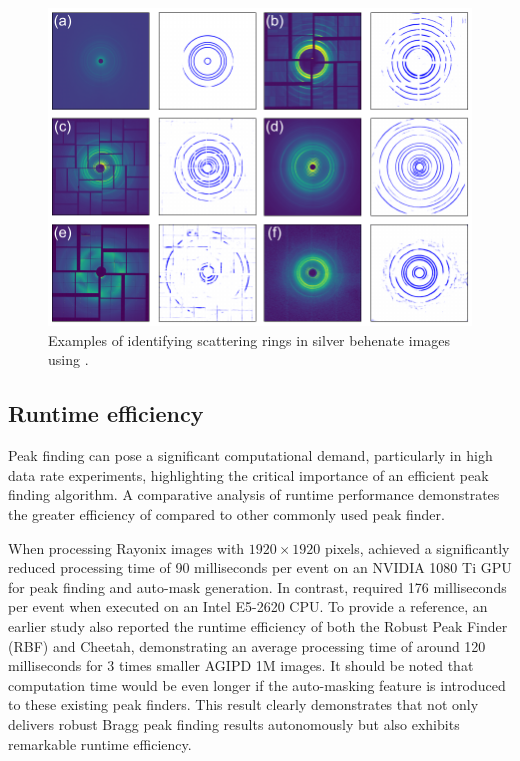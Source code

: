 \documentclass[a4paper]{article}
\begin{document}
\begin{figure}[!ht]
\centering
\includegraphics[width=\textwidth,keepaspectratio]
{./figures/automask.agbehnate.pdf}
\caption{Examples of identifying scattering rings in silver behenate images using
\peaknet{}.}
\label{fig : automask 2}
\end{figure}


\subsection{Runtime efficiency}

Peak finding can pose a significant computational demand, particularly in high data rate experiments, highlighting the critical importance of an efficient peak finding algorithm.  A comparative analysis of runtime performance demonstrates the greater efficiency of \peaknet{} compared to other commonly used \psocake{} peak finder.

When processing Rayonix images with $1920 \times 1920$ pixels, \peaknet{} achieved a significantly reduced processing time of 90 milliseconds per event on an NVIDIA 1080 Ti GPU for peak finding and auto-mask generation.  In contrast, \psocake{} required 176 milliseconds per event when executed on an Intel E5-2620 CPU.  To provide a reference, an earlier study \citep{hadian-jaziDataReductionSerial2021} also reported the runtime efficiency of both the Robust Peak Finder (RBF) and Cheetah, demonstrating an average processing time of around 120 milliseconds for 3 times smaller AGIPD 1M \citep{allahgholiAdaptiveGainIntegrating2019} images.  It should be noted that computation time would be even longer if the auto-masking feature is introduced to these existing peak finders. This result clearly demonstrates that \peaknet{} not only delivers robust Bragg peak finding results autonomously but also exhibits remarkable runtime efficiency.
\end{document}
